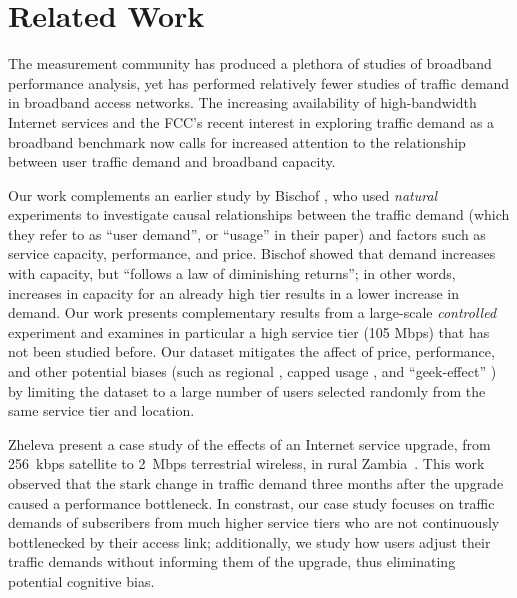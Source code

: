 \section{Related Work}\label{sec:related}

The measurement community has produced a plethora of studies of
broadband performance analysis, yet has performed relatively fewer
studies of traffic demand in broadband access networks.
The increasing availability of high-bandwidth Internet services and the
FCC's recent interest in exploring traffic  
demand as a broadband benchmark \cite{fcc2015progress-report} now calls
for increased attention to the relationship between user traffic demand
and broadband capacity.

Our work complements an earlier study by Bischof \ea \cite{dasu-imc2014},
who used {\em natural} experiments to investigate causal relationships between  
the traffic demand (which they refer to as ``user demand'', or ``usage''
in their paper) 
and factors such as service capacity, performance, and price. Bischof \ea showed 
that demand increases with capacity, but ``follows a law of diminishing  
returns''; in other words, increases in capacity for an already high
tier results in a lower 
increase in demand.
Our work presents complementary results from a large-scale {\em
  controlled} experiment and examines in particular a high service tier
(105 Mbps) that has not been studied before. Our dataset mitigates the
affect of price, performance, and other potential biases (such as
regional \cite{dasu-weather, dasu-region}, capped usage
\cite{youre-capped}, and ``geek-effect'' \cite{dasu-imc2014}) by
limiting the dataset to a large number of users selected randomly from
the same service tier and location.

Zheleva \ea present a case study of the effects of an Internet service
upgrade, from 256~kbps satellite to 2~Mbps terrestrial wireless, in
rural Zambia~\cite{zheleva2013}.  This work observed that the stark change in traffic
demand three months after the upgrade caused a performance
bottleneck. In constrast, our case study focuses on traffic demands of
subscribers from much higher service tiers who are not continuously
bottlenecked by their access link; additionally, we study how users
adjust their traffic demands without informing them of the upgrade, thus
eliminating potential cognitive bias.


